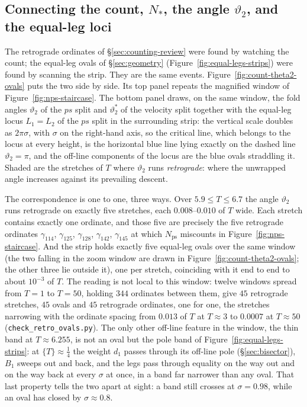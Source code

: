 \documentclass[11pt]{article}
\theoremstyle{definition}
\begin{document}
\subsection{Connecting the count, \texorpdfstring{$N_{\ast}$}{N*}, the angle
\texorpdfstring{$\vartheta_2$}{theta2}, and
the equal-leg loci}\label{sec:counting-ovals}

The retrograde ordinates of \S\ref{sec:counting-review} were found by watching
the count; the equal-leg ovals of \S\ref{sec:geometry}
(Figure~\ref{fig:equal-legs-strips}) were found by scanning the strip. They
are the same events. Figure~\ref{fig:count-theta2-ovals} puts the two
side by side. Its top panel repeats the magnified window of
Figure~\ref{fig:nps-staircase}. The bottom panel draws, on the same window,
the fold angles $\vartheta_2$ of the $ps$ split and $\vartheta_2^{\ast}$ of
the velocity split together with the equal-leg
locus $L_1=L_2$ of the $ps$ split in the surrounding strip: the vertical scale
doubles as $2\pi\sigma$, with $\sigma$ on the right-hand axis, so the critical
line, which belongs to the locus at every height, is the horizontal blue line
lying exactly on the dashed line $\vartheta_2=\pi$, and the off-line
components of the locus are the blue ovals straddling it. Shaded are the
stretches of $T$ where $\vartheta_2$ runs \emph{retrograde}: where the
unwrapped angle increases against its prevailing descent.

The correspondence is one to one, three ways. Over $5.9\leq T\leq6.7$ the
angle $\vartheta_2$ runs retrograde on exactly five stretches, each
$0.008$--$0.010$ of $T$ wide. Each stretch contains exactly one ordinate, and
those five are precisely the five retrograde ordinates $\gamma_{114}$,
$\gamma_{125}$, $\gamma_{128}$, $\gamma_{142}$, $\gamma_{145}$ at which
$N_{\mathrm{ps}}$ miscounts in Figure~\ref{fig:nps-staircase}. And the strip
holds exactly five equal-leg ovals over the same window (the two falling in
the zoom window are drawn in Figure~\ref{fig:count-theta2-ovals}; the other
three lie outside it), one per stretch,
coinciding with it end to end to about $10^{-3}$ of $T$. The reading is not
local to this window: twelve windows spread from $T=1$ to $T=50$, holding
$344$ ordinates between them, give $45$ retrograde stretches, $45$ ovals and
$45$ retrograde ordinates, one for one, the stretches narrowing with the
ordinate spacing from $0.013$ of $T$ at $T\approx3$ to $0.0007$ at
$T\approx50$ (\texttt{check\_retro\_ovals.py}). The only other
off-line feature in the window, the thin band at $T\approx6.255$, is not an
oval but the pole band of Figure~\ref{fig:equal-legs-strips}: at
$\{T\}\approx\tfrac14$ the weight $d_1$ passes through its off-line pole
(\S\ref{sec:bisector}), $B_1$ sweeps out and back, and the legs pass through
equality on the way out and on the way back at every $\sigma$ at once, in a
band far narrower than any oval. That last property tells the two apart at
sight: a band still crosses at $\sigma=0.98$, while an oval has closed by
$\sigma\approx0.8$.
\end{document}
